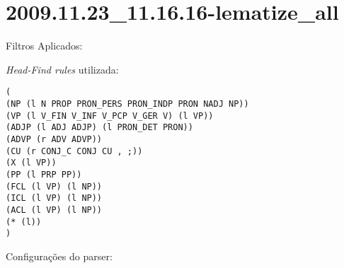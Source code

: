 \section{2009.11.23_11.16.16-lematize_all} %
\label{sec:exp:2009.11.23_11.16.16-lematize_all}

Filtros Aplicados:

\begin{itemize}
  
  \item{\emph{LematizeAll}
  
\end{itemize}

\emph{Head-Find rules} utilizada:

\scriptsize
\begin{verbatim}
(
(NP (l N PROP PRON_PERS PRON_INDP PRON NADJ NP))
(VP (l V_FIN V_INF V_PCP V_GER V) (l VP))
(ADJP (l ADJ ADJP) (l PRON_DET PRON))
(ADVP (r ADV ADVP))
(CU (r CONJ_C CONJ CU , ;))
(X (l VP))
(PP (l PRP PP))
(FCL (l VP) (l NP))
(ICL (l VP) (l NP))
(ACL (l VP) (l NP))
(* (l))
)

\end{verbatim}

\normalsize

Configurações do parser:

